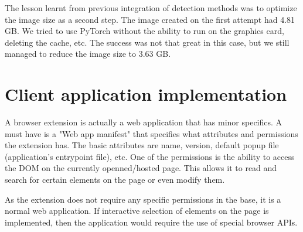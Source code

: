 The lesson learnt from previous integration of detection methods was to optimize the image size as a second step. The image created on the first attempt had 4.81 GB. We tried to use PyTorch without the ability to run on the graphics card, deleting the cache, etc. The success was not that great in this case, but we still managed to reduce the image size to 3.63 GB.

\chapter{Client application implementation}

A browser extension is actually a web application that has minor specifics. A must have is a "Web app manifest" that specifies what attributes and permissions the extension has. The basic attributes are name, version, default popup file (application's entrypoint file), etc. One of the permissions is the ability to access the DOM on the currently openned/hosted page. This allows it to read and search for certain elements on the page or even modify them.

As the extension does not require any specific permissions in the base, it is a normal web application. If interactive selection of elements on the page is implemented, then the application would require the use of special browser APIs.

